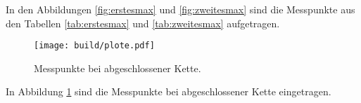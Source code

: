 In den Abbildungen \ref{fig:erstesmax} und \ref{fig:zweitesmax} sind die Messpunkte
aus den Tabellen \ref{tab:erstesmax} und \ref{tab:zweitesmax} aufgetragen.

\begin{figure}[h]
  \centering
  \texttt{[image: build/plote.pdf]}
  \caption{Messpunkte bei abgeschlossener Kette.}
  \label{fig:absw=wellw}
\end{figure}

In Abbildung \ref{fig:absw=wellw} sind die Messpunkte bei abgeschlossener Kette
eingetragen.
